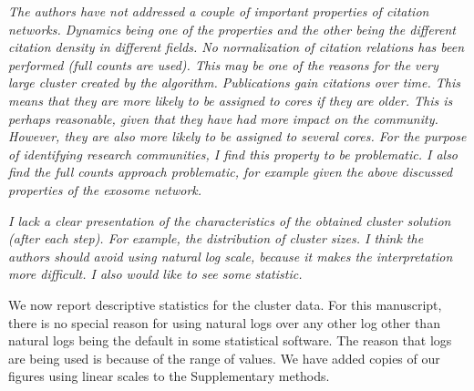 \documentclass[11pt, oneside]{article}   	%
\begin{document}
\emph{The authors have not addressed a couple of important properties of citation networks. Dynamics being one of the properties and the other being the different citation density in different fields. No normalization of citation relations has been performed (full counts are used). This may be one of the reasons for the very large cluster created by the algorithm. Publications gain citations over time. This means that they are more likely to be assigned to cores if they are older. This is perhaps reasonable, given that they have had more impact on the community. However, they are also more likely to be assigned to several cores. For the purpose of identifying research communities, I find this property to be problematic. I also find the full counts approach problematic, for example given the above discussed properties of the exosome network.}

\emph{I lack a clear presentation of the characteristics of the obtained cluster solution (after each step). For example, the distribution of cluster sizes. I think the authors should avoid using natural log scale, because it makes the interpretation more difficult. I also would like to see some statistic.}

We now report descriptive statistics for the cluster data. For this manuscript, there is no special reason for using natural logs over any other log other than natural logs being the default in some statistical software. The reason that logs are being used is because of the range of values. We have added copies of our figures using linear scales to the Supplementary methods. 

\vspace{4 mm}
\end{document}
